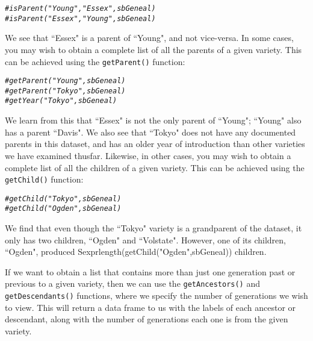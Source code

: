 \documentclass{article}\usepackage[]{graphicx}\usepackage[]{color}
\makeatletter
\newcommand{\hlcom}[1]{\textcolor[rgb]{0.678,0.584,0.686}{\textit{#1}}}%
\newenvironment{kframe}{%
 \def\at@end@of@kframe{}%
 \ifinner\ifhmode%
  \def\at@end@of@kframe{\end{minipage}}%
  \begin{minipage}{\columnwidth}%
 \fi\fi%
 \def\FrameCommand##1{\hskip\@totalleftmargin \hskip-\fboxsep
 \colorbox{shadecolor}{##1}\hskip-\fboxsep
     \hskip-\linewidth \hskip-\@totalleftmargin \hskip\columnwidth}%
 \MakeFramed {\advance\hsize-\width
   \@totalleftmargin\z@ \linewidth\hsize
   \@setminipage}}%
 {\par\unskip\endMakeFramed%
 \at@end@of@kframe}
\newenvironment{knitrout}{}{} %
\numberwithin{equation}{section} %
\makeatother
\begin{document}
\begin{knitrout}
\color{fgcolor}\begin{kframe}
\begin{alltt}
\hlcom{#isParent("Young","Essex",sbGeneal)}
\hlcom{#isParent("Essex","Young",sbGeneal)}
\end{alltt}
\end{kframe}
\end{knitrout}

We see that ``Essex" is a parent of ``Young", and not vice-versa. In some cases, you may wish to obtain a complete list of all the parents of a given variety. This can be achieved using the \texttt{getParent()} function:

\begin{knitrout}
\color{fgcolor}\begin{kframe}
\begin{alltt}
\hlcom{#getParent("Young",sbGeneal)}
\hlcom{#getParent("Tokyo",sbGeneal)}
\hlcom{#getYear("Tokyo", sbGeneal)}
\end{alltt}
\end{kframe}
\end{knitrout}

We learn from this that ``Essex" is not the only parent of ``Young"; ``Young" also has a parent ``Davis". We also see that ``Tokyo" does not have any documented parents in this dataset, and has an older year of introduction than other varieties we have examined thusfar. Likewise, in other cases, you may wish to obtain a complete list of all the children of a given variety. This can be achieved using the \texttt{getChild()} function:

\begin{knitrout}
\color{fgcolor}\begin{kframe}
\begin{alltt}
\hlcom{#getChild("Tokyo",sbGeneal)}
\hlcom{#getChild("Ogden",sbGeneal)}
\end{alltt}
\end{kframe}
\end{knitrout}

We find that even though the ``Tokyo" variety is a grandparent of the dataset, it only has two children, ``Ogden" and ``Volstate". However, one of its children, ``Ogden", produced Sexpr{length(getChild("Ogden",sbGeneal))} children.

If we want to obtain a list that contains more than just one generation past or previous to a given variety, then we can use the \texttt{getAncestors()} and \texttt{getDescendants()} functions, where we specify the number of generations we wish to view. This will return a data frame to us with the labels of each ancestor or descendant, along with the number of generations each one is from the given variety.
\end{document}
